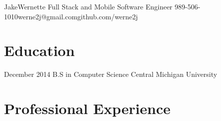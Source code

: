 \documentclass[]{friggeri-cv} %
\begin{document}
\header
{Jake}{Wernette}
{Full Stack and Mobile Software Engineer}
{989-506-1010\space\space\space\space\space\space werne2j@gmail.com\space\space\space\space\space\space github.com/werne2j}




\section{Education}

\begin{entrylist}
\entry
{December 2014}
{B.S in Computer Science{\normalfont}}
{Central Michigan University}

\end{entrylist}


\section{Professional Experience}
\end{document}
